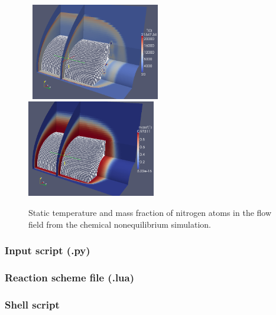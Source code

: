 \begin{figure}[htbp]
\hbox{
\includegraphics[width=0.5\textwidth]{../3D/finite-cylinder/thermal-eq/finite-cyl-T-with-mesh-aug2010.png}
\includegraphics[width=0.5\textwidth]{../3D/finite-cylinder/thermal-eq/finite-cyl-N-massf-with-mesh-aug2010.png}
}
\caption{Static temperature and mass fraction of nitrogen atoms in the flow field from the chemical nonequilibrium simulation.}
\label{finite-cyl-T-fig}
\end{figure}



\clearpage

\subsubsection{Input script (.py)}
\label{finite-cyl-script}
\topbar

\bottombar

\subsubsection{Reaction scheme file (.lua)}
\topbar

\bottombar

\pagebreak
\subsubsection{Shell script}
\label{finite-cyl-sh-files}
\topbar

\bottombar


